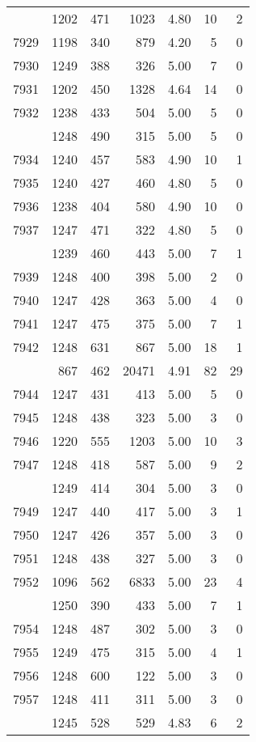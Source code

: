 \documentclass[
]{article}
\begin{document}
\begin{table}
\begin{tabular}[t]{lrrrrrr}
\addlinespace
7928 & 1202 & 471 & 1023 & 4.80 & 10 & 2\\
7929 & 1198 & 340 & 879 & 4.20 & 5 & 0\\
7930 & 1249 & 388 & 326 & 5.00 & 7 & 0\\
7931 & 1202 & 450 & 1328 & 4.64 & 14 & 0\\
7932 & 1238 & 433 & 504 & 5.00 & 5 & 0\\
\addlinespace
7933 & 1248 & 490 & 315 & 5.00 & 5 & 0\\
7934 & 1240 & 457 & 583 & 4.90 & 10 & 1\\
7935 & 1240 & 427 & 460 & 4.80 & 5 & 0\\
7936 & 1238 & 404 & 580 & 4.90 & 10 & 0\\
7937 & 1247 & 471 & 322 & 4.80 & 5 & 0\\
\addlinespace
7938 & 1239 & 460 & 443 & 5.00 & 7 & 1\\
7939 & 1248 & 400 & 398 & 5.00 & 2 & 0\\
7940 & 1247 & 428 & 363 & 5.00 & 4 & 0\\
7941 & 1247 & 475 & 375 & 5.00 & 7 & 1\\
7942 & 1248 & 631 & 867 & 5.00 & 18 & 1\\
\addlinespace
7943 & 867 & 462 & 20471 & 4.91 & 82 & 29\\
7944 & 1247 & 431 & 413 & 5.00 & 5 & 0\\
7945 & 1248 & 438 & 323 & 5.00 & 3 & 0\\
7946 & 1220 & 555 & 1203 & 5.00 & 10 & 3\\
7947 & 1248 & 418 & 587 & 5.00 & 9 & 2\\
\addlinespace
7948 & 1249 & 414 & 304 & 5.00 & 3 & 0\\
7949 & 1247 & 440 & 417 & 5.00 & 3 & 1\\
7950 & 1247 & 426 & 357 & 5.00 & 3 & 0\\
7951 & 1248 & 438 & 327 & 5.00 & 3 & 0\\
7952 & 1096 & 562 & 6833 & 5.00 & 23 & 4\\
\addlinespace
7953 & 1250 & 390 & 433 & 5.00 & 7 & 1\\
7954 & 1248 & 487 & 302 & 5.00 & 3 & 0\\
7955 & 1249 & 475 & 315 & 5.00 & 4 & 1\\
7956 & 1248 & 600 & 122 & 5.00 & 3 & 0\\
7957 & 1248 & 411 & 311 & 5.00 & 3 & 0\\
\addlinespace
7958 & 1245 & 528 & 529 & 4.83 & 6 & 2\\

\end{tabular}
\end{table}
\end{document}
